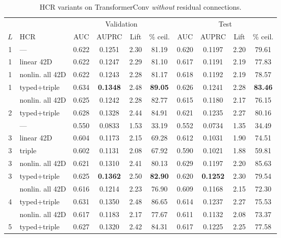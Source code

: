 \begin{table}[htbp]
  \centering
  \small
  \setlength{\tabcolsep}{4pt}
  \caption{HCR variants on TransformerConv \emph{without} residual
    connections.}
  \label{tab:hcr-nores}
  \begin{tabular}{clcccccccc}
    \toprule
    & & \multicolumn{4}{c}{Validation} & \multicolumn{4}{c}{Test} \\
    \cmidrule(lr){3-6}\cmidrule(lr){7-10}
    $L$ & HCR & AUC & AUPRC & Lift & \% ceil. & AUC & AUPRC & Lift & \% ceil. \\
    \midrule
    1 & ---              & 0.622 & 0.1251 & 2.30 & 81.19 & 0.620 & 0.1197 & 2.20 & 79.61 \\
    1 & linear 42D       & 0.622 & 0.1247 & 2.29 & 81.10 & 0.617 & 0.1191 & 2.19 & 77.83 \\
    1 & nonlin. all 42D  & 0.622 & 0.1243 & 2.28 & 81.17 & 0.618 & 0.1192 & 2.19 & 78.57 \\
    1 & typed+triple     & 0.634 & \textbf{0.1348} & 2.48 & \textbf{89.05} & 0.626 & 0.1241 & 2.28 & \textbf{83.46} \\
    \addlinespace[4pt]
    2 & nonlin. all 42D  & 0.625 & 0.1242 & 2.28 & 82.77 & 0.615 & 0.1180 & 2.17 & 76.15 \\
    2 & typed+triple     & 0.628 & 0.1328 & 2.44 & 84.91 & 0.621 & 0.1235 & 2.27 & 80.16 \\
    \addlinespace[4pt]
    3 & ---              & 0.550 & 0.0833 & 1.53 & 33.19 & 0.552 & 0.0734 & 1.35 & 34.49 \\
    3 & linear 42D       & 0.604 & 0.1173 & 2.15 & 69.28 & 0.612 & 0.1031 & 1.90 & 74.51 \\
    3 & triple           & 0.602 & 0.1131 & 2.08 & 67.92 & 0.590 & 0.1021 & 1.88 & 59.81 \\
    3 & nonlin. all 42D  & 0.621 & 0.1310 & 2.41 & 80.13 & 0.629 & 0.1197 & 2.20 & 85.63 \\
    3 & typed+triple     & 0.625 & \textbf{0.1362} & 2.50 & \textbf{82.90} & 0.620 & \textbf{0.1252} & 2.30 & 79.54 \\
    \addlinespace[4pt]
    4 & nonlin. all 42D  & 0.616 & 0.1214 & 2.23 & 76.90 & 0.609 & 0.1168 & 2.15 & 72.30 \\
    4 & typed+triple     & 0.631 & 0.1350 & 2.48 & 86.65 & 0.614 & 0.1237 & 2.27 & 75.53 \\
    \addlinespace[4pt]
    5 & nonlin. all 42D  & 0.617 & 0.1183 & 2.17 & 77.67 & 0.611 & 0.1132 & 2.08 & 73.37 \\
    5 & typed+triple     & 0.627 & 0.1320 & 2.42 & 84.31 & 0.617 & 0.1225 & 2.25 & 77.58 \\

\end{tabular}
\end{table}
